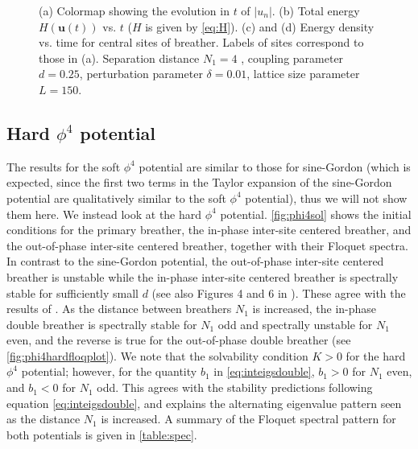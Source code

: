 \documentclass[12pt,reqno]{amsart}
\newcommand{\uvec}{\mathbf{u}}
\theoremstyle{definition}
\begin{document}
\begin{figure}
\begin{center}
\begin{subfigure}{0.45\linewidth}
		\label{fig:timestepSGpplongd}
	\end{subfigure}
	\end{center}
	\caption{(a) Colormap showing the evolution in $t$ of $|u_n|$. (b) Total energy $H(\uvec(t))$ vs. $t$ ($H$ is given by \cref{eq:H}). (c) and (d) Energy density vs. time for central sites of breather. Labels of sites correspond to those in (a). Separation distance $N_1 = 4$
	, coupling parameter $d=0.25$, perturbation parameter $\delta = 0.01$, lattice size parameter $L=150$.}
	\label{fig:timestepSGpplong}
\end{figure}

\subsection{Hard \texorpdfstring{$\phi^4$}{phi-4} potential}

The results for the soft $\phi^4$ potential are similar to those for sine-Gordon (which is expected, since the first two terms in the Taylor expansion of the sine-Gordon potential are qualitatively similar to the soft $\phi^4$ potential), thus we will not show them here. We instead look at the hard $\phi^4$ potential. \cref{fig:phi4sol} shows the initial conditions for the primary breather, the in-phase inter-site centered breather, and the out-of-phase inter-site centered breather, together with their Floquet spectra. In contrast to the sine-Gordon potential, the out-of-phase inter-site centered breather is unstable while the in-phase inter-site centered breather is spectrally stable for sufficiently small $d$ (see also Figures 4 and 6 in \cite{cuevas-maraver2016}). These agree with the results of \cites{Archilla2003,Koukouloyannis2009}. As the distance between breathers $N_1$ is increased, the in-phase double breather is spectrally stable for $N_1$ odd and spectrally unstable for $N_1$ even, and the reverse is true for the out-of-phase double breather (see \cref{fig:phi4hardfloqplot}). We note that the solvability condition $K > 0$ for the hard $\phi^4$ potential; however, for the quantity $b_1$ in \cref{eq:inteigsdouble}, $b_1 > 0$ for $N_1$ even, and $b_1 < 0$ for $N_1$ odd. This agrees with the stability predictions following equation \cref{eq:inteigsdouble}, and explains the alternating eigenvalue pattern seen as the distance $N_1$ is increased. A summary of the Floquet spectral pattern for both potentials is given in \cref{table:spec}.
\end{document}
